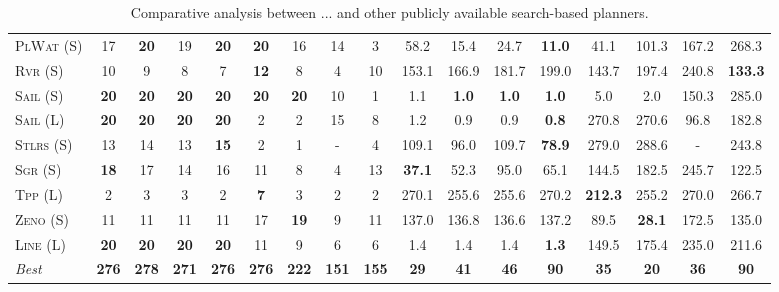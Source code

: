 \begin{table}[tb]
{\begin{tabular}{|l||cccccccc||cccccccc||}
\textsc{PlWat} (S)&17&\textbf{20}&19&\textbf{20}&\textbf{20}&16&14&3&58.2&15.4&24.7&\textbf{11.0}&41.1&101.3&167.2&268.3\\
\textsc{Rvr} (S)&10&9&8&7&\textbf{12}&8&4&10&153.1&166.9&181.7&199.0&143.7&197.4&240.8&\textbf{133.3}\\
\textsc{Sail} (S)&\textbf{20}&\textbf{20}&\textbf{20}&\textbf{20}&\textbf{20}&\textbf{20}&10&1&1.1&\textbf{1.0}&\textbf{1.0}&\textbf{1.0}&5.0&2.0&150.3&285.0\\
\textsc{Sail} (L)&\textbf{20}&\textbf{20}&\textbf{20}&\textbf{20}&2&2&15&8&1.2&0.9&0.9&\textbf{0.8}&270.8&270.6&96.8&182.8\\
\textsc{Stlrs} (S)&13&14&13&\textbf{15}&2&1&-&4&109.1&96.0&109.7&\textbf{78.9}&279.0&288.6&-&243.8\\
\textsc{Sgr} (S)&\textbf{18}&17&14&16&11&8&4&13&\textbf{37.1}&52.3&95.0&65.1&144.5&182.5&245.7&122.5\\
\textsc{Tpp} (L)&2&3&3&2&\textbf{7}&3&2&2&270.1&255.6&255.6&270.2&\textbf{212.3}&255.2&270.0&266.7\\
\textsc{Zeno} (S)&11&11&11&11&17&\textbf{19}&9&11&137.0&136.8&136.6&137.2&89.5&\textbf{28.1}&172.5&135.0\\
\textsc{Line} (L)&\textbf{20}&\textbf{20}&\textbf{20}&\textbf{20}&11&9&6&6&1.4&1.4&1.4&\textbf{1.3}&149.5&175.4&235.0&211.6
\\\hline
\textit{Best}&\textbf{276}&\textbf{278}&\textbf{271}&\textbf{276}&\textbf{276}&\textbf{222}&\textbf{151}&\textbf{155}&\textbf{29}&\textbf{41}&\textbf{46}&\textbf{90}&\textbf{35}&\textbf{20}&\textbf{36}&\textbf{90}\\\hline

        \end{tabular}}
        \caption{Comparative analysis between ... and other publicly available search-based planners.}
        \label{tab:search}
        \end{table}
        